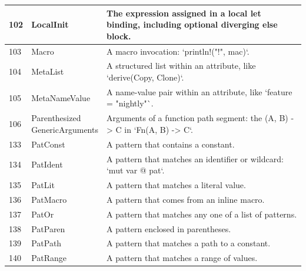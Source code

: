 \begin{longtable}{| p{} | p{} | p{} |}
102   & LocalInit                      & The expression assigned in a local let binding, including optional diverging else block.                       \\ \hline
103   & Macro                          & A macro invocation: `println!("{}!", mac)`.                                                                    \\ \hline
104   & MetaList                       & A structured list within an attribute, like `derive(Copy, Clone)`.                                             \\ \hline
105   & MetaNameValue                  & A name-value pair within an attribute, like `feature = "nightly"`.                                             \\ \hline
106   & \makecell{Parenthesized \\ GenericArguments}  & Arguments of a function path segment: the (A, B) -> C in `Fn(A, B) -> C`.                                      \\ \hline
133   & PatConst                       & A pattern that contains a constant.                                                                            \\ \hline
134   & PatIdent                       & A pattern that matches an identifier or wildcard: `mut var @ pat`.                                             \\ \hline
135   & PatLit                         & A pattern that matches a literal value.                                                                        \\ \hline
136   & PatMacro                       & A pattern that comes from an inline macro.                                                                     \\ \hline
137   & PatOr                          & A pattern that matches any one of a list of patterns.                                                          \\ \hline
138   & PatParen                       & A pattern enclosed in parentheses.                                                                             \\ \hline
139   & PatPath                        & A pattern that matches a path to a constant.                                                                   \\ \hline
140   & PatRange                       & A pattern that matches a range of values.                                                                      \\ \hline

\end{longtable}
